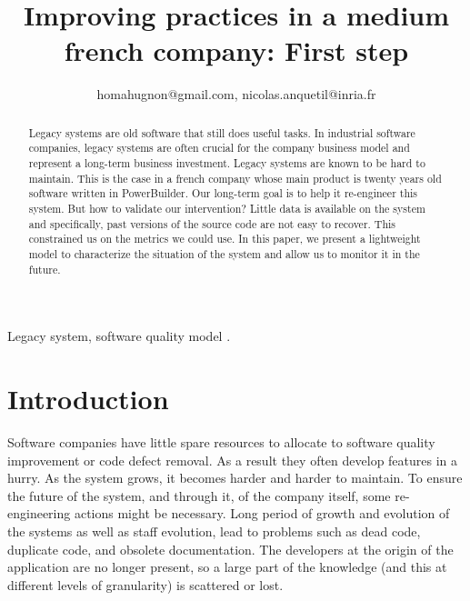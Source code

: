 \documentclass[10pt,conference]{IEEEtran}
\begin{document}
\title{Improving practices in a medium french  company: First step}

\author{
homahugnon@gmail.com, nicolas.anquetil@inria.fr}


\maketitle

\begin{abstract}
Legacy systems are old software that still does useful tasks.
In industrial software companies, legacy systems are often crucial for the company business model and represent a long-term business investment.
Legacy systems are known to be hard to maintain.
This is the case in a french company whose main product is twenty years old software written in PowerBuilder.
Our long-term goal is to help it re-engineer this system.
But how to validate our intervention?
Little data is available on the system and specifically, past versions of the source code are not easy to recover.
This constrained us on the metrics we could use.
In this paper, we present a lightweight model to characterize the situation of the system and allow us to monitor it in the future.
\end{abstract}

\begin{IEEEkeywords}
Legacy system, software quality model .
\end{IEEEkeywords}

\section{Introduction}

Software companies have little spare resources to allocate to software quality improvement or code defect removal.
As a result they often develop features in a hurry.
As the system grows, it becomes harder and harder to maintain.
To ensure the future of the system, and through it, of the company itself, some re-engineering actions might be necessary.
Long period of growth and evolution of the systems as well as staff evolution, lead to problems such as dead code, duplicate code, and obsolete documentation. 
The developers at the origin of the application are no longer present, so a large part of the knowledge (and this at different levels of granularity) is scattered or lost. 
\end{document}
